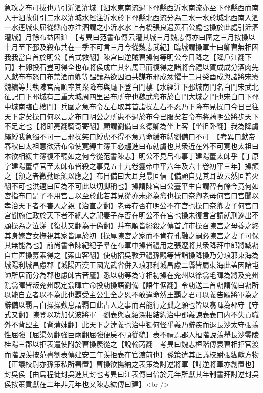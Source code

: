 急攻之布可拔也乃引沂泗灌城【泗水東南流過下邳縣西沂水南流亦至下邳縣西而南入于泗故併引二水以灌城水經注沂水於下邳縣北西流分為二水一水於城北西南入泗一水逕城東屈從縣南亦注泗謂之小沂水水上有橋張良遇黄石公處也操於此處引沂泗灌城】月餘布益困廹　【考異曰范書布傳云灌其城三月魏志傳亦曰圍之三月按操以十月至下邳及殺布共在一季不可言三月今從魏志武紀】臨城謂操軍士曰卿曹無相困我我當自首於明公【首式救翻】陳宫曰逆賊曹操何等明公今日降之【降戶江翻下同】若卵投石豈可得全也布將侯成亡其名馬已而復得之諸將合禮以賀成成分酒肉先入獻布布怒曰布禁酒而卿等醖釀為欲因酒共謀布邪成忿懼十二月癸酉成與諸將宋憲魏續等共執陳宫高順率其衆降布與麾下登白門樓【水經注下邳城南門名白門宋武北征記曰下邳城有三重大城周四里呂布所守也魏武禽布於白門大城之門也宋白曰下邳中城南臨白樓門】兵圍之急布令左右取其首詣操左右不忍乃下降布見操曰今日已往天下定矣操曰何以言之布曰明公之所患不過於布今已服矣若令布將騎明公將步天下不足定也【將即亮翻騎奇寄翻】顧謂劉備曰玄德卿為坐上客【坐徂卧翻】我為降虜繩縛我急獨不可一言邪操笑曰縛虎不得不急乃命緩布縛劉備曰不可　【考異曰獻帝春秋曰太祖意欲活布命使寛縛主簿王必趨進曰布勍虜也其衆近在外不可寛也太祖曰本欲相緩主簿復不聽如之何今從范書陳志】明公不見呂布事丁建陽董太師乎【丁原字建陽董卓官至太師布皆殺之事見五十九卷靈帝中平六年及六十卷初平三年】操頷之【頷之者微動頤頷以應之】布目備曰大耳兒最叵信【備顧自見其耳故云然叵普火翻不可也洪邁曰叵為不可此以切脚稱也】操謂陳宫曰公臺平生自謂智有餘今竟何如宮指布曰是子不用宫言以至於此若其見從亦未必為禽也操曰奈卿老母何宫曰宫聞以孝治天下者不害人之親【治直之翻】老母存否在明公不在宫也操曰奈卿妻子何宫曰宫聞施仁政於天下者不絶人之祀妻子存否在明公不在宫也操未復言宫請就刑遂出不顧操為之泣涕【復扶又翻為于偽翻】幷布順皆縊殺之傳首許市操召陳宫之母養之終其身嫁宫女撫視其家皆厚於初【操厚陳宮之家而不肯存孔融之嗣必陳宫之妻子可保其無能為也】前尚書令陳紀紀子羣在布軍中操皆禮用之張遼將其衆降拜中郎將臧覇自亡匿操募索得之【索山客翻】使覇招吳敦尹禮孫觀等皆詣操降操乃分琅邪東海為城陽利城昌慮郡【城陽西漢王國光武省併入琅邪利城昌慮二縣皆屬東海此盖因諸屯帥所居而分為郡也慮師古音廬】悉以覇等為守相初操在兖州以徐翕毛暉為將及兖州亂翕暉皆叛兖州既定翕暉亡命投覇操語劉備【語牛倨翻】令覇送二首覇謂備曰覇所以能自立者以不為此也覇受主公生全之恩不敢違命然王覇之君可以義告願將軍為之辭備以覇言白操操歎息謂覇曰此古人之事而君能行之孤之願也皆以翕暉為郡守【守式又翻】陳登以功加伏波將軍　劉表與袁紹深相結約治中鄧羲諫表表曰内不失貢職外不背盟主【背蒲妺翻】此天下之逹義也治中獨何怪乎羲乃辭疾而退長沙太守張羨性屈強【屈渠勿翻強巨兩翻屈強便戾不順從貌】表不禮焉郡人桓階說羨舉長沙零陵桂陽三郡以拒表遣使附於曹操羨從之【說輸芮翻　考異曰魏志桓階傳袁曹相拒官渡而階說羨按范書劉表傳建安三年羨拒表在官渡前也】孫策遣其正議校尉張紘獻方物【正議校尉亦孫策私所署置】曹操欲撫納之表策為討逆將軍【討逆將軍亦創置也】封吳侯【由烏程徙封吳進其封也考異曰江表傳曰倍於元年所獻其年制書拜討逆封吳侯按策貢獻在二年非元年也又陳志紘傳曰建】<br />
